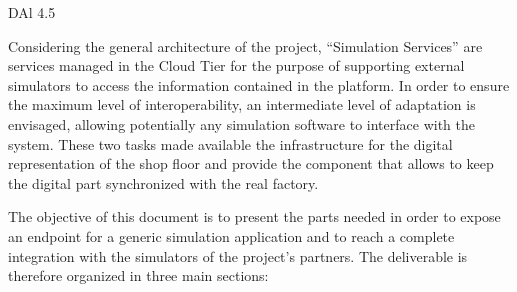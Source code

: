 DAl 4.5


Considering the general architecture of the project, “Simulation Services” are services managed in the Cloud Tier for the purpose of supporting external simulators to access the information contained in the platform. 
In order to ensure the maximum level of interoperability, an intermediate level of adaptation is envisaged, allowing potentially any simulation software to interface with the system.
These two tasks made available the infrastructure for the digital representation of the shop floor and provide the component that allows to keep the digital part synchronized with the real factory.




The objective of this document is to present the parts needed in order to expose an endpoint for a generic simulation application and to reach a complete integration with the simulators of the project's partners. The deliverable is therefore organized in three main sections:

